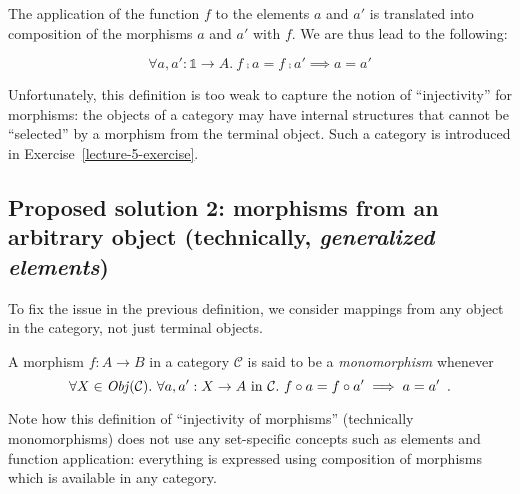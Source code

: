 The application of the function $f$ to the elements $a$ and $a'$ is translated
into composition of the morphisms $a$ and $a'$ with $f$.  We are thus lead to
the following:

\begin{equation*}
    \forall a, a' : \mathbb 1 \rightarrow A.\ f \comp a = f \comp a'
    \implies a = a'
\end{equation*}

Unfortunately, this definition is too weak to capture the notion of
``injectivity'' for morphisms: the objects of a category may have internal
structures that cannot be ``selected'' by a morphism from the terminal
object.  Such a category is introduced in Exercise~\ref{lecture-5-exercise}.

\subsection{Proposed solution 2: morphisms from an arbitrary object
  (technically, \emph{generalized elements})}

To fix the issue in the previous definition, we consider mappings from any
object in the category, not just terminal objects.

\begin{definition}
A morphism $f: A\to B$ in a category $\mathcal C$ is said to be a
\emph{monomorphism} whenever
\begin{equation*}
    \forall X \in \Ob(\mathcal C).\ 
    \forall a, a' : X \rightarrow A \text{ in }\mathcal C.\
      f \comp a = f \comp a' \implies a = a'
    \enspace.
\end{equation*}
\end{definition}

Note how this definition of ``injectivity of morphisms'' (technically
monomorphisms) does not use any set-specific concepts such as elements and
function application: everything is expressed using composition of morphisms
which is available in any category.

